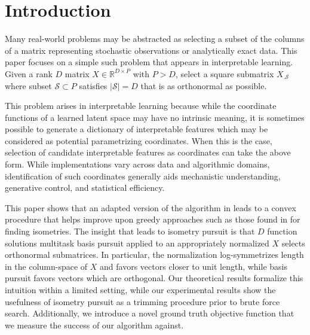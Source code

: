 \section{Introduction}
\label{sec:introduction}

Many real-world problems may be abstracted as selecting a subset of the columns of a matrix representing stochastic observations or analytically exact data.
This paper focuses on a simple such problem that appears in interpretable learning.
Given a rank $D$ matrix $ X \in \mathbb R^{D \times P}$ with $P > D$, select a square submatrix $ X_{.\mathcal S}$ where subset $\mathcal S \subset P$ satisfies $|\mathcal S| = D$ that is as orthonormal as possible.

This problem arises in interpretable learning because while the coordinate functions of a learned latent space may have no intrinsic meaning, it is sometimes possible to generate a dictionary of interpretable features which may be considered as potential parametrizing coordinates.
When this is the case, selection of candidate interpretable features as coordinates can take the above form.
While implementations vary across data and algorithmic domains, identification of such coordinates generally aids mechanistic understanding, generative control, and statistical efficiency.

This paper shows that an adapted version of the algorithm in \citet{Koelle2024-no} leads to a convex procedure that helps improve upon greedy approaches such as those found in \citet{NEURIPS2019_6a10bbd4, Kohli2021-lr, Jones2007-uc} for finding isometries.
The insight that leads to isometry pursuit is that $D$ function solutions multitask basis pursuit applied to an appropriately normalized $ X$ selects orthonormal submatrices.
In particular, the normalization log-symmetrizes length in the column-space of $ X$ and favors vectors closer to unit length, while basis pursuit favors vectors which are orthogonal.
Our theoretical results formalize this intuition within a limited setting, while our experimental results show the usefulness of isometry pursuit as a trimming procedure prior to brute force search.
Additionally, we introduce a novel ground truth objective function that we measure the success of our algorithm against.
